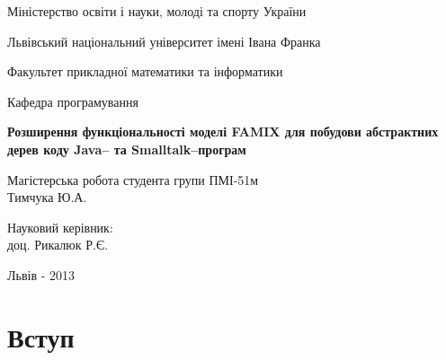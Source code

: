 \documentclass[12pt,a4paper]{article}
\begin{document}

\thispagestyle{empty}
\setlength{\parindent}{1.5cm}
\fontsize{14pt}{6mm}\selectfont

\begin{center}
  Міністерство освіти і науки, молоді та спорту України
  
  Львівський національний університет імені Івана Франка

  Факультет прикладної математики та інформатики
\end{center}

\vspace{1cm}

\begin{flushright}
  Кафедра програмування
\end{flushright}

\vspace{4cm}

\begin{center}
  {\bfseries\Large Розширення функціональності моделі FAMIX для побудови абстрактних дерев коду Java-- та Smalltalk--програм}
\end{center}

\vspace{2cm}

\begin{small}
\begin{flushleft}
  Магістерська робота студента групи ПМІ-51м\\
  Тимчука Ю.А.\linebreak
  
  Науковий керівник:\\
  доц. Рикалюк Р.Є.
\end{flushleft}
\end{small}

\vspace{5cm}

\begin{center}
  Львів - 2013 
\end{center}

\clearpage



\fontsize{14pt}{6mm}\selectfont

\newcommand{\vect}[1]{(#1_1,#1_2,\dots,#1_n)}

\thispagestyle{empty}
\tableofcontents
\clearpage
{}

\section{Вступ}
\end{document}
